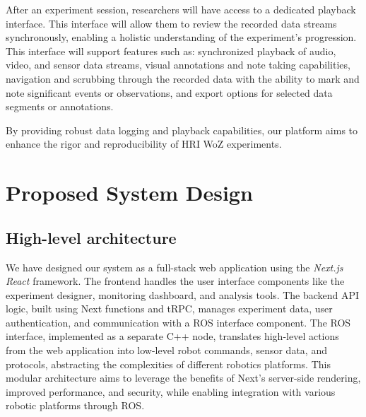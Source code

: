 \documentclass[letterpaper, 10 pt, conference]{ieeeconf}
\begin{document}
After an experiment session, researchers will have access to a dedicated playback interface. This interface will allow them to review the recorded data streams synchronously, enabling a holistic understanding of the experiment's progression. This interface will support features such as: synchronized playback of audio, video, and sensor data streams, visual annotations and note taking capabilities, navigation and scrubbing through the recorded data with the ability to mark and note significant events or observations, and export options for selected data segments or annotations.

By providing robust data logging and playback capabilities, our platform aims to enhance the rigor and reproducibility of HRI WoZ experiments.


\section{Proposed System Design}

\subsection{High-level architecture}

We have designed our system as a full-stack web application using the \emph{Next.js React} framework. The frontend handles the user interface components like the experiment designer, monitoring dashboard, and analysis tools. The backend API logic, built using Next functions and tRPC, manages experiment data, user authentication, and communication with a ROS interface component. The ROS interface, implemented as a separate C++ node, translates high-level actions from the web application into low-level robot commands, sensor data, and protocols, abstracting the complexities of different robotics platforms. This modular architecture aims to leverage the benefits of Next's server-side rendering, improved performance, and security, while enabling integration with various robotic platforms through ROS.
\end{document}

